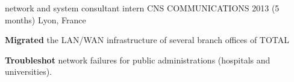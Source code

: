 \begin{cventries}
  \cventry
  {network and system consultant intern} %
  {CNS COMMUNICATIONS} %
  {2013 (5 months)} %
  {Lyon, France} %
    {
      \begin{cvitems} %
      \item {\textbf{Migrated} the LAN/WAN infrastructure of several branch offices of TOTAL}
      \item {\textbf{Troubleshot} network failures for public administrations (hospitals and universities).}
      \end{cvitems}
    }


\end{cventries}
